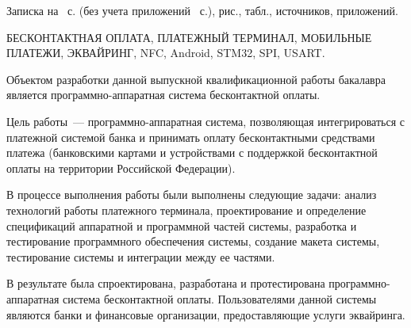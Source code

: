 \newpage


Записка на~\pageref{LastPage} с. (без учета приложений~ с.),  рис., \totaltables{} табл.,  источников,  приложений.

БЕСКОНТАКТНАЯ ОПЛАТА, ПЛАТЕЖНЫЙ ТЕРМИНАЛ, МОБИЛЬНЫЕ ПЛАТЕЖИ, ЭКВАЙРИНГ, NFC, Android, STM32, SPI, USART.

Объектом разработки данной выпускной квалификационной работы бакалавра является программно-аппаратная система бесконтактной оплаты.

Цель работы~--- программно-аппаратная система, позволяющая интегрироваться с платежной системой банка и принимать оплату бесконтактными средствами платежа (банковскими картами и устройствами с поддержкой бесконтактной оплаты на территории Российской Федерации).

В процессе выполнения работы были выполнены следующие задачи: анализ технологий работы платежного терминала, проектирование и определение спецификаций аппаратной и программной частей системы, разработка и тестирование программного обеспечения системы, создание макета системы, тестирование системы и интеграции между ее частями.

В результате была спроектирована, разработана и протестирована программно-аппаратная система бесконтактной оплаты.
Пользователями данной системы являются банки и финансовые организации, предоставляющие услуги эквайринга.
